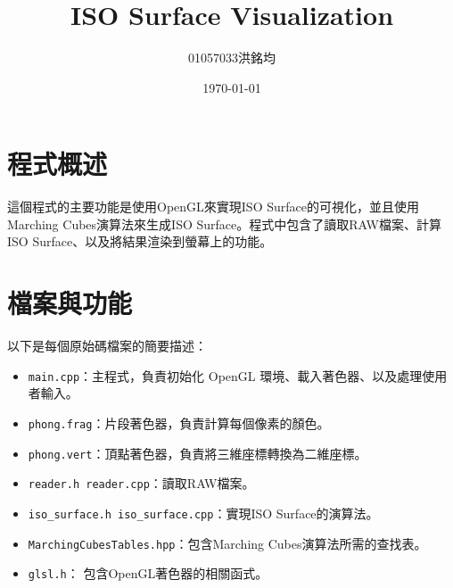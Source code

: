 \documentclass[a4paper,12pt]{article}
\title{ISO Surface Visualization}
\author{01057033洪銘均}
\date{\today}
\begin{document}
\maketitle
\tableofcontents
\newpage

\section{程式概述}
這個程式的主要功能是使用OpenGL來實現ISO Surface的可視化，並且使用Marching Cubes演算法來生成ISO Surface。程式中包含了讀取RAW檔案、計算ISO Surface、以及將結果渲染到螢幕上的功能。

\section{檔案與功能}
以下是每個原始碼檔案的簡要描述：
\begin{itemize}
    \item \texttt{main.cpp}：主程式，負責初始化 OpenGL 環境、載入著色器、以及處理使用者輸入。
    \item \texttt{phong.frag}：片段著色器，負責計算每個像素的顏色。
    \item \texttt{phong.vert}：頂點著色器，負責將三維座標轉換為二維座標。
    \item \texttt{reader.h reader.cpp}：讀取RAW檔案。
    \item \texttt{iso\_surface.h iso\_surface.cpp}：實現ISO Surface的演算法。
    \item \texttt{MarchingCubesTables.hpp}：包含Marching Cubes演算法所需的查找表。
    \item \texttt{glsl.h}： 包含OpenGL著色器的相關函式。
\end{itemize}
\end{document}
